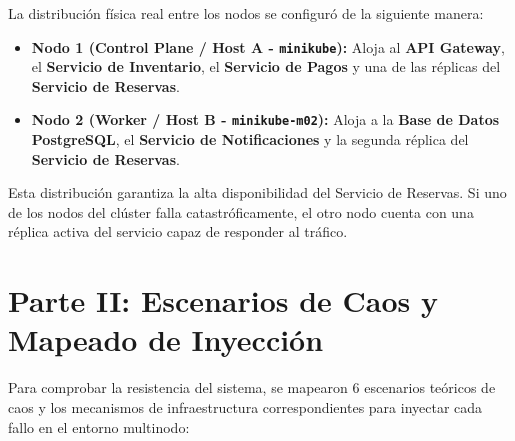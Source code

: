 \documentclass[12pt,letterpaper]{article}
\begin{document}
La distribución física real entre los nodos se configuró de la siguiente manera:
\begin{itemize}
    \item \textbf{Nodo 1 (Control Plane / Host A - \texttt{minikube}):} Aloja al \textbf{API Gateway}, el \textbf{Servicio de Inventario}, el \textbf{Servicio de Pagos} y una de las réplicas del \textbf{Servicio de Reservas}.
    \item \textbf{Nodo 2 (Worker / Host B - \texttt{minikube-m02}):} Aloja a la \textbf{Base de Datos PostgreSQL}, el \textbf{Servicio de Notificaciones} y la segunda réplica del \textbf{Servicio de Reservas}.
\end{itemize}

Esta distribución garantiza la alta disponibilidad del Servicio de Reservas. Si uno de los nodos del clúster falla catastróficamente, el otro nodo cuenta con una réplica activa del servicio capaz de responder al tráfico.

\newpage

\section{Parte II: Escenarios de Caos y Mapeado de Inyección}
Para comprobar la resistencia del sistema, se mapearon 6 escenarios teóricos de caos y los mecanismos de infraestructura correspondientes para inyectar cada fallo en el entorno multinodo:
\end{document}
